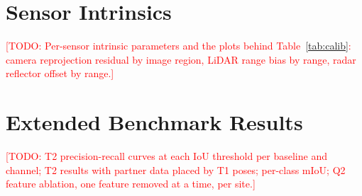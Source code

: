 \documentclass[conference]{IEEEtran}
\newcommand{\todo}[1]{\textcolor{red}{[TODO: #1]}}
\begin{document}


\section{Sensor Intrinsics}
\label{app:intrinsics}
\todo{Per-sensor intrinsic parameters and the plots behind
Table~\ref{tab:calib}: camera reprojection residual by image region,
LiDAR range bias by range, radar reflector offset by range.}



\section{Extended Benchmark Results}
\label{app:results}
\todo{T2 precision-recall curves at each IoU threshold per baseline
and channel; T2 results with partner data placed by T1 poses;
per-class mIoU; Q2 feature ablation, one feature removed at a time,
per site.}




\end{document}
